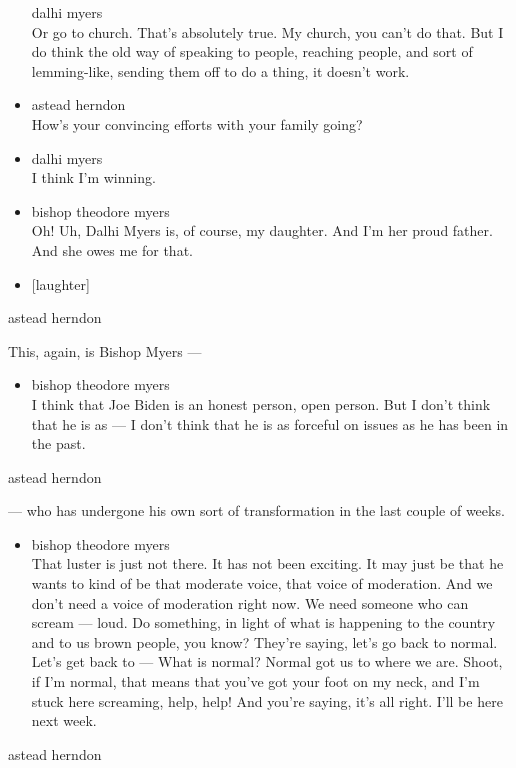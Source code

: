 \begin{itemize}
  dalhi myers\\
  Or go to church. That's absolutely true. My church, you can't do that.
  But I do think the old way of speaking to people, reaching people, and
  sort of lemming-like, sending them off to do a thing, it doesn't work.
\item
  astead herndon\\
  How's your convincing efforts with your family going?
\item
  dalhi myers\\
  I think I'm winning.
\item
  bishop theodore myers\\
  Oh! Uh, Dalhi Myers is, of course, my daughter. And I'm her proud
  father. And she owes me for that.
\item
  {[}laughter{]}
\end{itemize}

astead herndon

This, again, is Bishop Myers ---

\begin{itemize}
\tightlist
\item
  bishop theodore myers\\
  I think that Joe Biden is an honest person, open person. But I don't
  think that he is as --- I don't think that he is as forceful on issues
  as he has been in the past.
\end{itemize}

astead herndon

--- who has undergone his own sort of transformation in the last couple
of weeks.

\begin{itemize}
\tightlist
\item
  bishop theodore myers\\
  That luster is just not there. It has not been exciting. It may just
  be that he wants to kind of be that moderate voice, that voice of
  moderation. And we don't need a voice of moderation right now. We need
  someone who can scream --- loud. Do something, in light of what is
  happening to the country and to us brown people, you know? They're
  saying, let's go back to normal. Let's get back to --- What is normal?
  Normal got us to where we are. Shoot, if I'm normal, that means that
  you've got your foot on my neck, and I'm stuck here screaming, help,
  help! And you're saying, it's all right. I'll be here next week.
\end{itemize}

astead herndon

